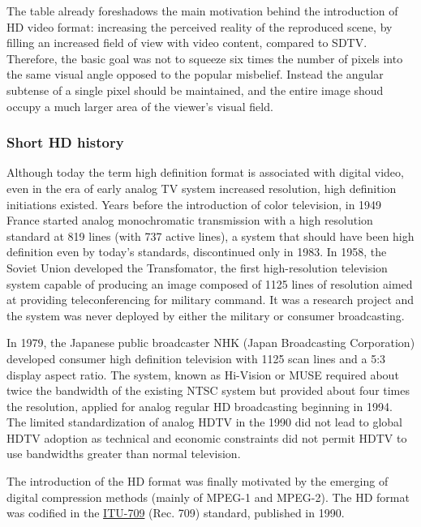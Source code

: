 The table already foreshadows the main motivation behind the introduction of HD video format: increasing the perceived reality of the reproduced scene, by filling an increased field of view with video content, compared to SDTV. Therefore, the basic goal was not to squeeze six times the number of pixels into the same visual angle opposed to the popular misbelief.
Instead the angular subtense of a single pixel should be maintained, and the entire image shoud occupy a much larger area of the viewer's visual field.

\subsubsection*{Short HD history}

Although today the term high definition format is associated with digital video, even in the era of early analog TV system increased resolution, high definition initiations existed.
Years before the introduction of color television, in 1949 France started analog monochromatic transmission with a high resolution standard at 819 lines (with 737 active lines), a system that should have been high definition even by today's standards, discontinued only in 1983. 
In 1958, the Soviet Union developed the Transfomator, the first high-resolution television system capable of producing an image composed of 1125 lines of resolution aimed at providing teleconferencing for military command. It was a research project and the system was never deployed by either the military or consumer broadcasting.

In 1979, the Japanese public broadcaster NHK (Japan Broadcasting Corporation) developed consumer high definition television with 1125 scan lines and a 5:3 display aspect ratio.
The system, known as Hi-Vision or MUSE required about twice the bandwidth of the existing NTSC system but provided about four times the resolution, applied for analog regular HD broadcasting beginning in 1994.
The limited standardization of analog HDTV in the 1990 did not lead to global HDTV adoption as technical and economic constraints did not permit HDTV to use bandwidths greater than normal television.

The introduction of the HD format was finally motivated by the emerging of digital compression methods (mainly of MPEG-1 and MPEG-2).
The HD format was codified in the \href{https://www.itu.int/dms_pubrec/itu-r/rec/bt/R-REC-BT.709-6-201506-I!!PDF-E.pdf}{ITU-709} (Rec. 709) standard, published in 1990.

